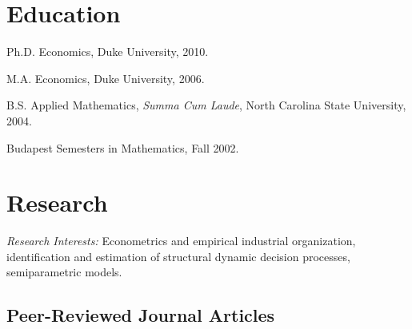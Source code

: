 \documentclass[10pt,letterpaper]{article}
\renewenvironment{itemize}{
  \begin{list}{}{
    \setlength{\leftmargin}{1.5em}
    \setlength{\itemsep}{0.25em}
    \setlength{\parskip}{0pt}
    \setlength{\parsep}{0.25em}
  }
}{
  \end{list}
}
\begin{document}
\section*{Education}

\begin{itemize}
  \item Ph.D. Economics, Duke University, 2010.
  \item M.A. Economics, Duke University, 2006.
  \item B.S. Applied Mathematics, \textit{Summa Cum Laude},
    North Carolina State University, 2004.
  \item Budapest Semesters in Mathematics, Fall 2002.
\end{itemize}

\section*{Research}

\textit{Research Interests:} Econometrics and empirical industrial organization, identification and estimation of structural dynamic decision processes, semiparametric models.

\subsection*{Peer-Reviewed Journal Articles}
\end{document}
